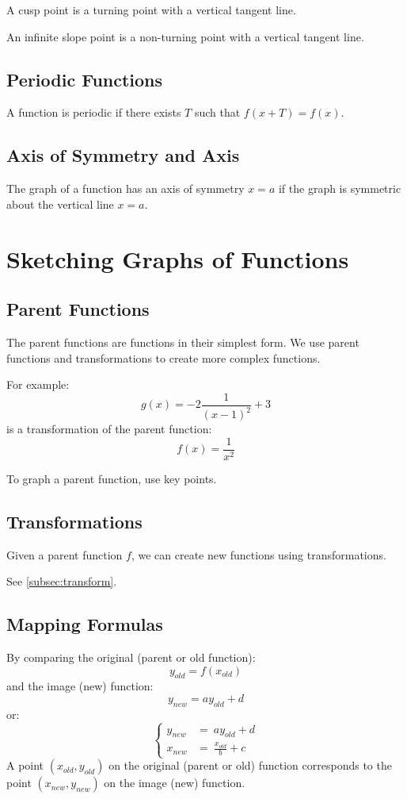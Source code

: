			A cusp point is a turning point with a vertical tangent line.

			An infinite slope point is a non-turning point with a vertical tangent line.
		\subsection{Periodic Functions}
			A function is periodic if there exists $T$ such that $f(x + T) = f(x)$.
		\subsection{Axis of Symmetry and Axis}
			The graph of a function has an axis of symmetry $x=a$ if the graph is symmetric about the vertical line $x=a$.
	\section{Sketching Graphs of Functions}
		\subsection{Parent Functions}
			The parent functions are functions in their simplest form. We use parent functions and transformations to create more complex functions.

			For example:
			\[g(x) = -2\frac{1}{(x-1)^2}+3\]
			is a transformation of the parent function:
			\[f(x) = \frac{1}{x^2}\]

			To graph a parent function, use key points.
		\subsection{Transformations}
			Given a parent function $f$, we can create new functions using transformations.

			See \ref{subsec:transform}.
		\subsection{Mapping Formulas}
			By comparing the original (parent or old function):
			\[y_{old} = f(x_{old})\]
			and the image (new) function:
			\[y_{new} = ay_{old} + d\]
			or:
			\begin{equation*}
				\begin{cases}
					y_{new} &=\ ay_{old}+d\\
					x_{new} &=\ \frac{x_{old}}{b}+c
				\end{cases}
			\end{equation*}
			A point $(x_{old}, y_{old})$ on the original (parent or old) function corresponds to the point $(x_{new}, y_{new})$ on the image (new) function.
